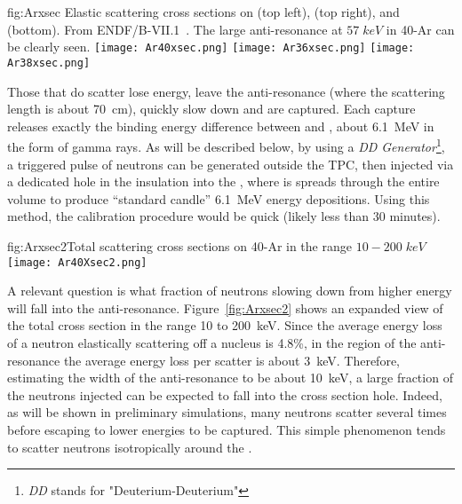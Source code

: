 \begin{dunefigure}{fig:Arxsec}
{Elastic scattering cross sections on  (top left),  (top right), and  (bottom). From ENDF/B-VII.1~\cite{ref:ENDF}. The large anti-resonance at $57\; keV$ in 40-Ar can be clearly seen.}
\texttt{[image: Ar40xsec.png]}
\texttt{[image: Ar36xsec.png]}
\texttt{[image: Ar38xsec.png]}
\end{dunefigure}


Those that do scatter lose energy, leave the anti-resonance (where the scattering length is about \SI{70}{\cm}), quickly slow down and are captured. Each capture releases exactly the binding energy difference between  and , about \SI{6.1}{\MeV} in the form of gamma rays.  As will be described below, by using a {\it DD Generator}\footnote{{\it DD} stands for "Deuterium-Deuterium" }, a triggered pulse of neutrons can be generated outside the TPC, then injected via a dedicated hole in the insulation into the , where is spreads through the entire volume to produce ``standard candle'' \SI{6.1}{\MeV} energy depositions. Using this method, 
the calibration procedure would be quick (likely less than 30 minutes).

\begin{dunefigure}[h]{fig:Arxsec2}{Total scattering cross sections on 40-Ar in the range $10-200\; keV$~\cite{ref:ENDF}}
\texttt{[image: Ar40Xsec2.png]}
\end{dunefigure}

A relevant question is what fraction of neutrons slowing down from higher energy will fall into the anti-resonance. Figure~\ref{fig:Arxsec2} shows an expanded view of the total  cross section in the range  \num{10} to \SI{200}{\keV}. Since the average energy loss of a neutron elastically scattering off a  nucleus is \num{4.8}\%, in the region of the anti-resonance the average energy loss per scatter is about \SI{3}{\keV}. Therefore, estimating the width of the anti-resonance to be about \SI{10}{\keV}, a large fraction of the neutrons injected can be expected to fall into the cross section hole. Indeed, as will be shown in preliminary simulations, many neutrons scatter several times before escaping to lower energies to be captured. This simple phenomenon tends to scatter neutrons isotropically around the .

